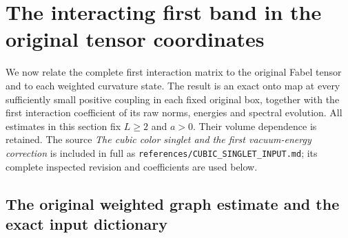 \section{The interacting first band in the original tensor coordinates}
\label{sec:interacting-tensor-band}

We now relate the complete first interaction matrix to the original
Fabel tensor and to each weighted curvature state. The result is an
exact onto map at every sufficiently small positive coupling in each
fixed original box, together with the first interaction coefficient of
its raw norms, energies and spectral evolution. All estimates in this
section fix $L\ge2$ and $a>0$. Their volume dependence is retained.
The source \emph{The cubic color singlet and the first vacuum-energy
correction} is included in full as
\texttt{references/CUBIC\_SINGLET\_INPUT.md}; its complete inspected
revision and coefficients are used below.

\subsection{The original weighted graph estimate and the exact input dictionary}

